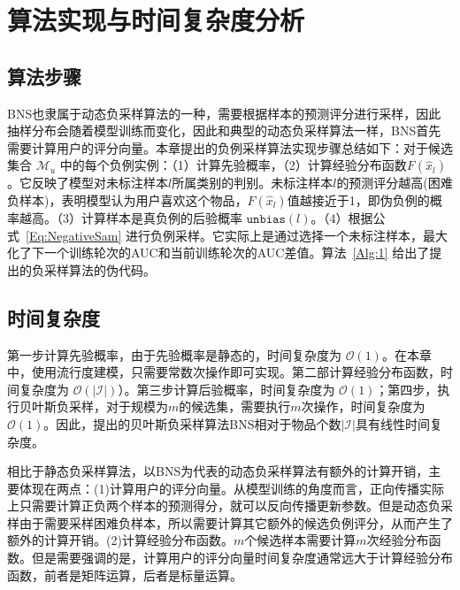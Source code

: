 \section{算法实现与时间复杂度分析}
\subsection{算法步骤}
BNS也隶属于动态负采样算法的一种，需要根据样本的预测评分进行采样，因此抽样分布会随着模型训练而变化，因此和典型的动态负采样算法一样，BNS首先需要计算用户的评分向量。本章提出的负例采样算法实现步骤总结如下：对于候选集合 $\mathcal{M}_u$ 中的每个负例实例：（1）计算先验概率，（2）计算经验分布函数$F(\hat{x}_l)$。它反映了模型对未标注样本$l$所属类别的判别。未标注样本$l$的预测评分越高(困难负样本)，表明模型认为用户喜欢这个物品，$F(\hat{x}_l)$值越接近于1，即伪负例的概率越高。（3）计算样本是真负例的后验概率 $\mathtt{unbias}(l)$。（4）根据公式~\eqref{Eq:NegativeSam} 进行负例采样。它实际上是通过选择一个未标注样本，最大化了下一个训练轮次的AUC和当前训练轮次的AUC差值。算法~\ref{Alg:1} 给出了提出的负采样算法的伪代码。


\subsection{时间复杂度}
第一步计算先验概率，由于先验概率是静态的，时间复杂度为 $\mathcal{O}(1)$。在本章中，使用流行度建模，只需要常数次操作即可实现。第二部计算经验分布函数，时间复杂度为 $\mathcal{O}(\vert\mathcal{I}\vert)$）。第三步计算后验概率，时间复杂度为 $\mathcal{O}(1)$；第四步，执行贝叶斯负采样，对于规模为$m$的候选集，需要执行$m$次操作，时间复杂度为 $\mathcal{O}(1)$。因此，提出的贝叶斯负采样算法\textsf{BNS}相对于物品个数$|\mathcal{I}|$具有线性时间复杂度。

相比于静态负采样算法，以BNS为代表的动态负采样算法有额外的计算开销，主要体现在两点：(1)计算用户的评分向量。从模型训练的角度而言，正向传播实际上只需要计算正负两个样本的预测得分，就可以反向传播更新参数。但是动态负采样由于需要采样困难负样本，所以需要计算其它额外的候选负例评分，从而产生了额外的计算开销。(2)计算经验分布函数。$m$个候选样本需要计算$m$次经验分布函数。但是需要强调的是，计算用户的评分向量时间复杂度通常远大于计算经验分布函数，前者是矩阵运算，后者是标量运算。




